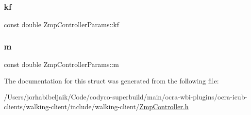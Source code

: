 \hypertarget{structZmpControllerParams_a6138cbf819799519abd3864bd8bf05cf}{}\label{structZmpControllerParams_a6138cbf819799519abd3864bd8bf05cf} 
\subsubsection{\texorpdfstring{kf}{kf}}
{\footnotesize\ttfamily const double Zmp\+Controller\+Params\+::kf}

\hypertarget{structZmpControllerParams_a1a3eea24e276953f2e74c4066b24106c}{}\label{structZmpControllerParams_a1a3eea24e276953f2e74c4066b24106c} 
\subsubsection{\texorpdfstring{m}{m}}
{\footnotesize\ttfamily const double Zmp\+Controller\+Params\+::m}



The documentation for this struct was generated from the following file\+:\begin{DoxyCompactItemize}
\item 
/\+Users/jorhabibeljaik/\+Code/codyco-\/superbuild/main/ocra-\/wbi-\/plugins/ocra-\/icub-\/clients/walking-\/client/include/walking-\/client/\hyperlink{ZmpController_8h}{Zmp\+Controller.\+h}\end{DoxyCompactItemize}
